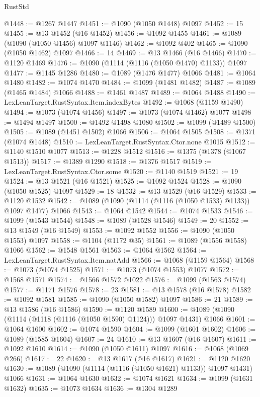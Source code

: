 \begin{lexlean}{RustStd}
\begin{coremodule}
{\begin{coremodule}
{{{{{{{{{{{{{{@1448 := @1267 @1447
@1451 := @1090 (@1050 @1448) @1097
@1452 := 15
@1455 := @13 @1452 (@16 @1452)
@1456 := @1092 @1455
@1461 := @1089 (@1090 (@1050 @1456) @1097 @1146)
@1462 := @1092 @402
@1465 := @1090 (@1050 @1462) @1097
@1466 := 14
@1469 := @13 @1466 (@16 @1466)
@1470 := @1120 @1469
@1476 := @1090 (@1114 (@1116 (@1050 @1470) @1133)) @1097
@1477 := @1145 @1286
@1480 := @1089 (@1476 @1477) @1066
@1481 := @1064 @1480
@1482 := @1074 @1470
@1484 := @1099 (@1481 @1482)
@1487 := @1089 (@1465 @1484) @1066
@1488 := @1461 @1487
@1489 := @1064 @1488
@1490 := LexLeanTarget.RustSyntax.Item.indexBytes
@1492 := @1068 (@1159 @1490)
@1494 := @1073 (@1074 @1456)
@1497 := @1073 (@1074 @1462) @1077
@1498 := @1494 @1497
@1500 := @1492 @1498 @1080
@1502 := @1099 (@1489 @1500)
@1505 := @1089 (@1451 @1502) @1066
@1506 := @1064 @1505
@1508 := @1371 (@1074 @1448)
@1510 := LexLeanTarget.RustSyntax.Ctor.none @1015
@1512 := @1140 @1510 @1077
@1513 := @1228 @1512
@1516 := @1375 (@1378 (@1067 @1513))
@1517 := @1389 @1290
@1518 := @1376 @1517
@1519 := LexLeanTarget.RustSyntax.Ctor.some
@1520 := @1140 @1519
@1521 := 19
@1524 := @13 @1521 (@16 @1521)
@1525 := @1092 @1524
@1528 := @1090 (@1050 @1525) @1097
@1529 := 18
@1532 := @13 @1529 (@16 @1529)
@1533 := @1120 @1532
@1542 := @1089 (@1090 (@1114 (@1116 (@1050 @1533) @1133)) @1097 @1477) @1066
@1543 := @1064 @1542
@1544 := @1074 @1533
@1546 := @1099 (@1543 @1544)
@1548 := @1089 (@1528 @1546)
@1549 := 20
@1552 := @13 @1549 (@16 @1549)
@1553 := @1092 @1552
@1556 := @1090 (@1050 @1553) @1097
@1558 := @1104 (@1172 @35)
@1561 := @1089 (@1556 @1558) @1066
@1562 := @1548 @1561
@1563 := @1064 @1562
@1564 := LexLeanTarget.RustSyntax.Item.natAdd
@1566 := @1068 (@1159 @1564)
@1568 := @1073 (@1074 @1525)
@1571 := @1073 (@1074 @1553) @1077
@1572 := @1568 @1571
@1574 := @1566 @1572 @1022
@1576 := @1099 (@1563 @1574)
@1577 := @1171 @1576
@1578 := 23
@1581 := @13 @1578 (@16 @1578)
@1582 := @1092 @1581
@1585 := @1090 (@1050 @1582) @1097
@1586 := 21
@1589 := @13 @1586 (@16 @1586)
@1590 := @1120 @1589
@1600 := @1089 (@1090 (@1114 (@1118 (@1116 (@1050 @1590) @1124))) @1097 @1431) @1066
@1601 := @1064 @1600
@1602 := @1074 @1590
@1604 := @1099 (@1601 @1602)
@1606 := @1089 (@1585 @1604)
@1607 := 24
@1610 := @13 @1607 (@16 @1607)
@1611 := @1092 @1610
@1614 := @1090 (@1050 @1611) @1097
@1616 := @1068 (@1069 @266)
@1617 := 22
@1620 := @13 @1617 (@16 @1617)
@1621 := @1120 @1620
@1630 := @1089 (@1090 (@1114 (@1116 (@1050 @1621) @1133)) @1097 @1431) @1066
@1631 := @1064 @1630
@1632 := @1074 @1621
@1634 := @1099 (@1631 @1632)
@1635 := @1073 @1634
@1636 := @1304 @1289
}}}}}}}}}}}}}}
\end{coremodule}}
\end{coremodule}
\end{lexlean}
